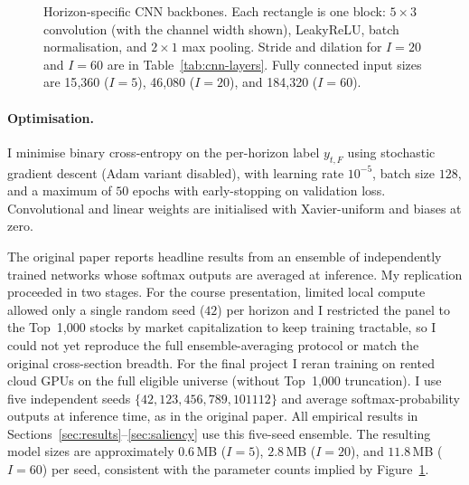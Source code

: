 \documentclass{article}
\begin{document}
\begin{figure}[H]
{%
  }
  \caption{Horizon-specific CNN backbones. Each rectangle is one block:
    $5{\times}3$ convolution (with the channel width shown), LeakyReLU,
    batch normalisation, and $2{\times}1$ max pooling. Stride and dilation
    for $I=20$ and $I=60$ are in Table~\ref{tab:cnn-layers}. Fully connected
    input sizes are 15{,}360 ($I=5$), 46{,}080 ($I=20$), and 184{,}320 ($I=60$).}
  \label{fig:cnn-arch}
\end{figure}

\paragraph{Optimisation.}
I minimise binary cross-entropy on the per-horizon label $y_{t,F}$ using
stochastic gradient descent (Adam variant disabled), with learning rate
$10^{-5}$, batch size $128$, and a maximum of $50$ epochs with
early-stopping on validation loss. Convolutional and linear weights are
initialised with Xavier-uniform and biases at zero.

The original paper reports headline results from an ensemble of
independently trained networks whose softmax outputs are averaged at
inference. My replication proceeded in two stages. For the course
presentation, limited local compute allowed only a single random seed
($42$) per horizon and I restricted the panel to the Top~1{,}000 stocks
by market capitalization to keep training tractable, so I could not yet
reproduce the full ensemble-averaging protocol or match the original
cross-section breadth. For the final project I reran training on
rented cloud GPUs on the full eligible universe (without Top~1{,}000
truncation). I use five independent seeds
$\{42, 123, 456, 789, 101112\}$ and average
softmax-probability outputs at inference time, as in the original paper.
All empirical results in Sections~\ref{sec:results}--\ref{sec:saliency}
use this five-seed ensemble. The resulting model sizes are approximately
$0.6$\,MB ($I=5$), $2.8$\,MB ($I=20$), and $11.8$\,MB ($I=60$) per seed,
consistent with the parameter counts implied by Figure~\ref{fig:cnn-arch}.
\end{document}

